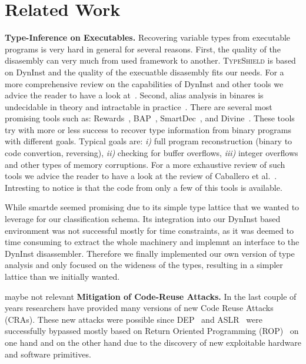\section{Related Work}
\label{chapter:Related_Work}

\textbf{Type-Inference on Executables.}
\label{Type-Inference on Executables}
Recovering variable types from executable programs
is very hard in general for several reasons. 
First, the quality of the disasembly can very much from used
framework to another. \textsc{TypeShield} is based on DynInst 
and the quality of the execuatble disasembly fits our needs. 
For a more comprehensive review on the capabilities of DynInst and other tools we
advice the reader to have a look at~\cite{andriesse:indepth}.
Second, alias analysis in binares is undecidable in theory and intractable in practice~\cite{alan:mycroft}.
There are several most promising tools such as: Rewards~\cite{lin:rewards}, BAP~\cite{bap:brumley}, 
SmartDec~\cite{fokin:smartdec}, and Divine~\cite{divine:balakrishnan}.
These tools try with more or less success to recover 
type information from binary programs with different goals.
Typical goals are: 
\textit{i)} full program reconstruction (binary to code convertion, reversing), 
\textit{ii)} checking for buffer overflows, 
\textit{iii)} integer overflows and other types of memory corruptions.
For a more exhaustive review of such tools we advice the reader to
have a look at the review of Caballero et al.~\cite{caballero:inference}.
Intresting to notice is that the code from only a few of this tools is available.

While smartde seemed promising due to its simple type lattice that we wanted to leverage for our classification schema. Its integration into our DynInst based environment was not successful mostly for time constraints, as it was deemed to time consuming to extract the whole machinery and implemnt an interface to the DynInst disassembler.
Therefore we finally implemented our own version of type analysis and only focused on the wideness of the types, resulting in a simpler lattice than we initially wanted.

maybe not relevant
\textbf{Mitigation of Code-Reuse Attacks.}
\label{Mitigation of Code-Reuse Attacks}
In the last couple of years researchers have provided many versions of new Code Reuse Attacks (CRAs).
These new attacks were possible since DEP~\cite{dep} and ASLR~\cite{ASLR} were successfully bypassed mostly based
on Return Oriented Programming (ROP)~\cite{ROP, kornau:rop, rop:shacham} on one hand and on 
the other hand due to the discovery of new exploitable hardware and software primitives.

